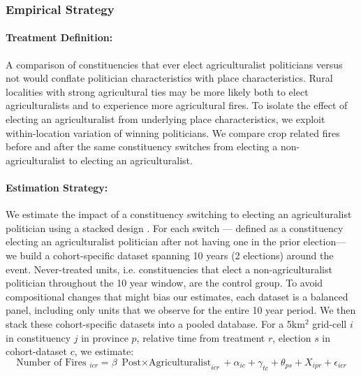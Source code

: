 \documentclass[12pt]{article}
\begin{document}
\subsubsection{Empirical Strategy \label{sssec:empirics3}}
\paragraph{Treatment Definition:} 
A comparison of constituencies that ever elect agriculturalist politicians versus not would conflate politician characteristics with place characteristics. Rural localities with strong agricultural ties may be more likely both to elect agriculturalists and to experience more agricultural fires. 
To isolate the effect of electing an agriculturalist from underlying place characteristics, we exploit within-location variation of winning politicians.  We compare crop related fires before and after the same constituency switches from electing a non-agriculturalist to electing an agriculturalist. %


\paragraph{Estimation Strategy:}
We estimate the impact of a constituency switching to electing an agriculturalist politician using a stacked design \citep{cengiz2019effect}. For each switch --- defined as a constituency electing an agriculturalist politician after not having one in the prior election--- we build a cohort-specific dataset spanning 10 years (2 elections) around the event. Never-treated units, i.e. constituencies that elect a non-agriculturalist politician throughout the 10 year window, are the control group.  To avoid compositional changes that might bias our estimates, each dataset is a balanced panel, including only units that we observe for the entire 10 year period. We then stack these cohort-specific datasets into a pooled database. For a 5km$^2$ grid-cell $i$ in constituency $j$ in province $p$, relative time from treatment $r$, election $s$ in cohort-dataset $c$, we estimate:
\begin{equation}\label{eq_agriculture}
 { \text{Number of Fires } }_{i c r}=\beta {\text{ Post$\times$Agriculturalist}}_{i c r}+ \alpha_{ic}+ \gamma_{tc} + \theta_{ps}+ X_{ipr} + \epsilon_{i c r}
\end{equation}
\end{document}
